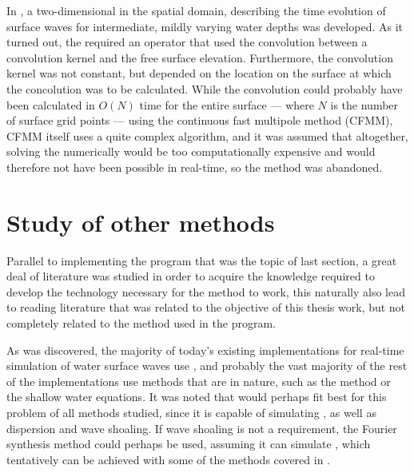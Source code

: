 In , a two-dimensional \PDE in the spatial domain, describing the time evolution of surface waves for intermediate, mildly varying water depths was developed. As it turned out, the \PDE required an operator that used the convolution between a convolution kernel and the free surface elevation. Furthermore, the convolution kernel was not constant, but depended on the location on the surface at which the concolution was to be calculated. While the convolution could probably have been calculated in $O(N)$ time for the entire surface --- where $N$ is the number of surface grid points --- using the continuous fast multipole method (CFMM), CFMM itself uses a quite complex algorithm, and it was assumed that altogether, solving the \PDE numerically would be too computationally expensive and would therefore not have been possible in real-time, so the method was abandoned.

\section{Study of other methods}

Parallel to implementing the program that was the topic of last section, a great deal of literature was studied in order to acquire the knowledge required to develop the technology necessary for the method to work, this naturally also lead to reading literature that was related to the objective of this thesis work, but not completely related to the method used in the program.

As was discovered, the majority of today's existing implementations for real-time simulation of water surface waves use , and probably the vast majority of the rest of the implementations use methods that are  in nature, such as the \LPD method or the shallow water equations. It was noted that \LPD would perhaps fit best for this problem of all methods studied, since it is capable of simulating \FSI, as well as dispersion and wave shoaling. If wave shoaling is not a requirement, the Fourier synthesis method could perhaps be used, assuming it can simulate \FSI, which tentatively can be achieved with some of the methods covered in .
